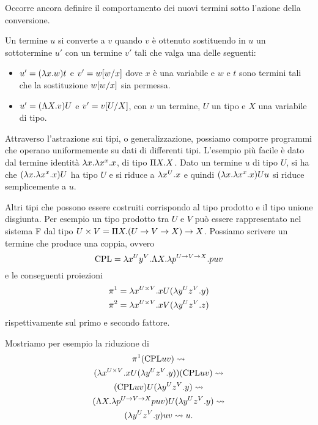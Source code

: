 \documentclass[]{marticle}
\begin{document}
Occorre ancora definire il comportamento dei nuovi termini sotto l'azione della
conversione.
\begin{block}[Definizione]
    Un termine $u$ si converte a $v$ quando $v$ \`e ottenuto sostituendo in $u$
    un sottotermine $u'$ con un termine $v'$ tali che valga una delle seguenti:
    \begin{itemize}
        \item $u'= (\l x. w)t$ e $v' = w\sub{w}{x}$ dove $x$ \`e una variabile e
            $w$ e $t$ sono termini tali che la sostituzione $w\sub{w}{x}$ sia
            permessa.
        \item $u' = (\L X.v)U$ e $v'=v\sub{U}{X}$, con $v$ un termine, $U$ un
            tipo e $X$ una variabile di tipo.
    \end{itemize}
\end{block}

Attraverso l'astrazione sui tipi, o generalizzazione, possiamo comporre
programmi che operano uniformemente su dati di differenti tipi. L'esempio pi\`u
facile \`e dato dal termine identit\`a $\l x. \l x^x. x$, di tipo $\P X. X$.
Dato un termine $u$ di tipo $U$, si ha che $(\l x. \l x^x. x)U$ ha tipo $U$ e si
riduce a $\l x^U.x$ e quindi $(\l x. \l x^x. x)Uu$ si riduce semplicemente a
$u$.

Altri tipi che possono essere costruiti corrispondo al tipo prodotto e il tipo
unione disgiunta. Per esempio un tipo prodotto tra $U$ e $V$ pu\`o essere
rappresentato nel sistema F dal tipo $U\times V = \P X. (U\rar V \rar X) \rar
X$. Possiamo scrivere un termine che produce una coppia, ovvero
\[
    \text{CPL} = \l x^U  y^V. \L X. \l p^{U \rar V\rar X}. puv
\]
e le conseguenti proiezioni
\begin{gather*}
    \pi^1 = \l x^{U\times V}. xU(\l y^U z^V.y) \\
    \pi^2 = \l x^{U\times V}. xV(\l y^U z^V.z)
\end{gather*}
rispettivamente sul primo e secondo fattore.

Mostriamo per esempio la riduzione di 
\begin{gather*}
    \pi^1 (\text{CPL}uv) \conv \\
    (\l x^{U\times V}. xU(\l y^U z^V.y))(\text{CPL}uv) \conv \\
    (\text{CPL}uv)U (\l y^U z^V.y) \conv \\
    (\L X. \l p^{U\rar V \rar X} puv)U (\l y^U z^V.y)  \conv \\
    (\l y^U z^V.y)uv \conv u.
\end{gather*}
\end{document}
